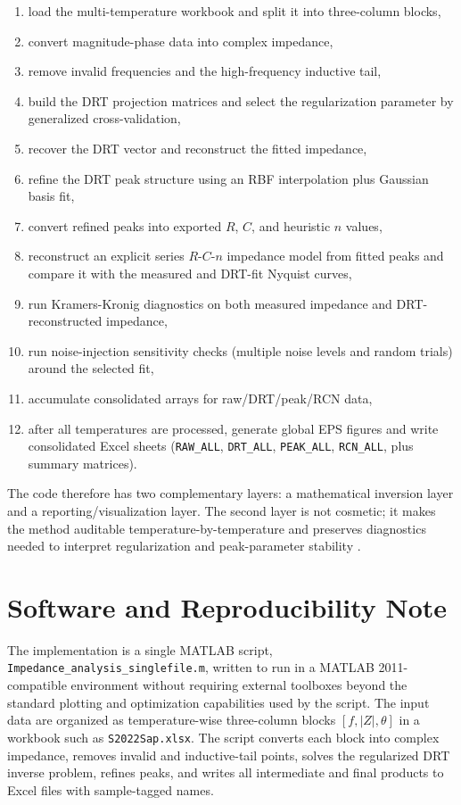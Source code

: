 \documentclass[11pt]{article}
\begin{document}
\begin{enumerate}
\item load the multi-temperature workbook and split it into three-column blocks,
\item convert magnitude-phase data into complex impedance,
\item remove invalid frequencies and the high-frequency inductive tail,
\item build the DRT projection matrices and select the regularization parameter by generalized cross-validation,
\item recover the DRT vector and reconstruct the fitted impedance,
\item refine the DRT peak structure using an RBF interpolation plus Gaussian basis fit,
\item convert refined peaks into exported $R$, $C$, and heuristic $n$ values,
\item reconstruct an explicit series $R$-$C$-$n$ impedance model from fitted peaks and compare it with the measured and DRT-fit Nyquist curves,
\item run Kramers-Kronig diagnostics on both measured impedance and DRT-reconstructed impedance,
\item run noise-injection sensitivity checks (multiple noise levels and random trials) around the selected fit,
\item accumulate consolidated arrays for raw/DRT/peak/RCN data,
\item after all temperatures are processed, generate global EPS figures and write consolidated Excel sheets (\texttt{RAW\_ALL}, \texttt{DRT\_ALL}, \texttt{PEAK\_ALL}, \texttt{RCN\_ALL}, plus summary matrices).
\end{enumerate}

The code therefore has two complementary layers: a mathematical inversion layer and a reporting/visualization layer. The second layer is not cosmetic; it makes the method auditable temperature-by-temperature and preserves diagnostics needed to interpret regularization and peak-parameter stability \cite{schluter2019,maradesa2023,carbone2025}.

\section{Software and Reproducibility Note}

The implementation is a single MATLAB script, \texttt{Impedance\_analysis\_singlefile.m}, written to run in a MATLAB 2011-compatible environment without requiring external toolboxes beyond the standard plotting and optimization capabilities used by the script. The input data are organized as temperature-wise three-column blocks $[f, |Z|, \theta]$ in a workbook such as \texttt{S2022Sap.xlsx}. The script converts each block into complex impedance, removes invalid and inductive-tail points, solves the regularized DRT inverse problem, refines peaks, and writes all intermediate and final products to Excel files with sample-tagged names.
\end{document}
